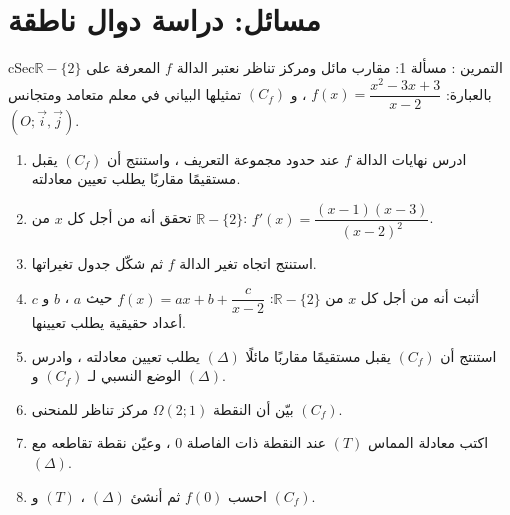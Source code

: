 \documentclass[12pt,a4paper]{article}
\newenvironment{BOX}[2]{\begin{otherlanguage}{english}\begin{arbox}{#1}{#2}}{\end{arbox}\end{otherlanguage}}
\newcounter{exo}
\newenvironment{tamrin}[1]{\stepcounter{exo}\begin{BOX}{cSec}{التمرين \theexo: #1}}{\end{BOX}}
\newcommand{\R}{\mathbb{R}}
\begin{document}
\section{مسائل: دراسة دوال ناطقة}
\begin{tamrin}{مسألة 1: مقارب مائل ومركز تناظر}
نعتبر الدالة $f$ المعرفة على $\R-\{2\}$ بالعبارة: $f(x)=\dfrac{x^2-3x+3}{x-2}$ ، و $(C_f)$ تمثيلها البياني في معلم متعامد ومتجانس $(O;\vec i,\vec j)$.
\begin{enumerate}
\item ادرس نهايات الدالة $f$ عند حدود مجموعة التعريف ، واستنتج أن $(C_f)$ يقبل مستقيمًا مقاربًا يطلب تعيين معادلته.
\item تحقق أنه من أجل كل $x$ من $\R-\{2\}$: $f'(x)=\dfrac{(x-1)(x-3)}{(x-2)^2}$.
\item استنتج اتجاه تغير الدالة $f$ ثم شكّل جدول تغيراتها.
\item أثبت أنه من أجل كل $x$ من $\R-\{2\}$: $f(x)=ax+b+\dfrac{c}{x-2}$ حيث $a$ ، $b$ و $c$ أعداد حقيقية يطلب تعيينها.
\item استنتج أن $(C_f)$ يقبل مستقيمًا مقاربًا مائلًا $(\Delta)$ يطلب تعيين معادلته ، وادرس الوضع النسبي لـ $(C_f)$ و $(\Delta)$.
\item بيّن أن النقطة $\Omega(2;1)$ مركز تناظر للمنحنى $(C_f)$.
\item اكتب معادلة المماس $(T)$ عند النقطة ذات الفاصلة $0$ ، وعيّن نقطة تقاطعه مع $(\Delta)$.
\item احسب $f(0)$ ثم أنشئ $(\Delta)$ ، $(T)$ و $(C_f)$.
\end{enumerate}
\end{tamrin}
\end{document}

